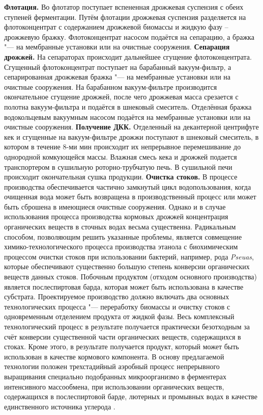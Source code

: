 \textbf{Флотация.} 
Во флотатор поступает вспененная дрожжевая суспензия с обеих ступеней ферментации. 
Путём флотации дрожжевая суспензия разделяется на флотоконцентрат с содержанием дрожжевой биомассы и жидкую фазу -- дрожжевую бражку. 
Флотоконцентрат насосом подаётся на сепарацию, а бражка "--- на мембранные установки или на очистные сооружения. \textbf{Сепарация дрожжей.} 
На сепараторах происходит дальнейшее сгущение флотоконцентрата. 
Сгущенный флотоконцентрат поступает на барабанный вакуум-фильтр, а сепарированная дрожжевая бражка "--- на мембранные установки или на очистные сооружения. 
На барабанном вакуум-фильтре производится окончательное сгущение дрожжей, после чего дрожжевая масса срезается с полотна вакуум-фильтра и подаётся в шнековый смеситель. 
Отделённая бражка водокольцевым вакуумным насосом подаётся на мембранные установки или на очистные сооружения. 
\textbf{Получение ДКК.} 
Отделенный на декантерной центрифуге кек и сгущенные на вакуум-фильтре дрожжи поступают в шнековый смеситель, в котором в течение 8-ми мин происходит их непрерывное перемешивание до однородной комкующейся массы. 
Влажная смесь кека и дрожжей подается транспортером в сушильную роторно-трубчатую печь. 
В сушильной печи происходит окончательная сушка продукции. \textbf{Очистка стоков.} 
В процессе производства обеспечивается частично замкнутый цикл водопользования, когда очищенная вода может быть возвращена в производственный процесс или может быть сброшена в имеющиеся очистные сооружения. 
Однако и в случае использования процесса производства кормовых дрожжей концентрация органических веществ в сточных водах весьма существенна. 
Радикальным способом, позволяющим решить указанные проблемы, является совмещение химико-технологического процесса производства этанола с биохимическим процессом очистки стоков при использовании бактерий, например, рода \textit{Pseuas}, которые обеспечивают существенно большую степень конверсии органических веществ данных стоков. 
Побочным продуктом (отходом основного производства) является послеспиртовая барда, которая может быть использована в качестве субстрата. 
Проектируемое производство должно включать два основных технологических процесса "--- переработку биомассы и очистку стоков с одновременным отделением продукта от жидкой фазы. 
Весь комплексный технологический процесс в результате получается практически безотходным за счёт конверсии существенной части органических веществ, содержащихся в стоках. 
Кроме этого, в результате получается продукт, который может быть использован в качестве кормового компонента. 
В основу предлагаемой технологии положен трехстадийный аэробный процесс непрерывного выращивания специально подобранных микроорганизмо в ферментерах интенсивного массообмена, при использовании органических веществ, содержащихся в послеспиртовой барде, лютерных и промывных водах в качестве единственного источника углерода \cite{Novikov_2007_2_Journal}. 

